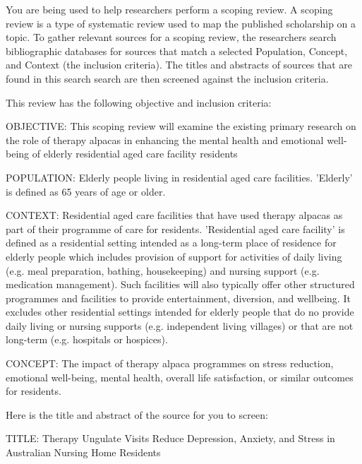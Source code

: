 \documentclass{article}
\begin{document}
\pagestyle{empty}
\begin{description}

  \User You are being used to help researchers perform a scoping review. A
  scoping review is a type of systematic review used to map the published
  scholarship on a topic. To gather relevant sources for a scoping review, the
  researchers search bibliographic databases for sources that match a selected
  Population, Concept, and Context (the inclusion criteria). The titles and
  abstracts of sources that are found in this search search are then screened
  against the inclusion criteria.

  This review has the following objective and inclusion criteria:

  OBJECTIVE: This scoping review will examine the existing primary research on
  the role of therapy alpacas in enhancing the mental health and emotional
  well-being of elderly residential aged care facility residents

  POPULATION: Elderly people living in residential aged care facilities.
  'Elderly' is defined as 65 years of age or older.

  CONTEXT: Residential aged care facilities that have used therapy alpacas as
  part of their programme of care for residents. 'Residential aged care
  facility' is defined as a residential setting intended as a long-term place
  of residence for elderly people which includes provision of support for
  activities of daily living (e.g. meal preparation, bathing, housekeeping) and
  nursing support (e.g. medication management). Such facilities will also
  typically offer other structured programmes and facilities to provide
  entertainment, diversion, and wellbeing. It excludes other residential
  settings intended for elderly people that do no provide daily living or
  nursing supports (e.g. independent living villages) or that are not long-term
  (e.g. hospitals or hospices).

  CONCEPT: The impact of therapy alpaca programmes on stress reduction,
  emotional well-being, mental health, overall life satisfaction, or similar
  outcomes for residents.

  Here is the title and abstract of the source for you to screen:

  TITLE: Therapy Ungulate Visits Reduce Depression, Anxiety, and Stress in
  Australian Nursing Home Residents


\end{description}
\end{document}
